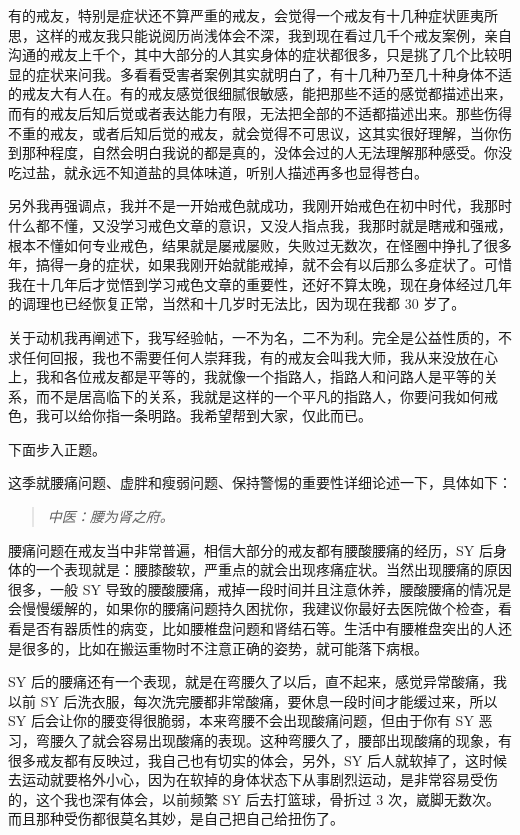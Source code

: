\documentclass{ctexart}
\begin{document}
有的戒友，特别是症状还不算严重的戒友，会觉得一个戒友有十几种症状匪夷所思，这样的戒友我只能说阅历尚浅体会不深，我到现在看过几千个戒友案例，亲自沟通的戒友上千个，其中大部分的人其实身体的症状都很多，只是挑了几个比较明显的症状来问我。多看看受害者案例其实就明白了，有十几种乃至几十种身体不适的戒友大有人在。有的戒友感觉很细腻很敏感，能把那些不适的感觉都描述出来，而有的戒友后知后觉或者表达能力有限，无法把全部的不适都描述出来。那些伤得不重的戒友，或者后知后觉的戒友，就会觉得不可思议，这其实很好理解，当你伤到那种程度，自然会明白我说的都是真的，没体会过的人无法理解那种感受。你没吃过盐，就永远不知道盐的具体味道，听别人描述再多也显得苍白。

另外我再强调点，我并不是一开始戒色就成功，我刚开始戒色在初中时代，我那时什么都不懂，又没学习戒色文章的意识，又没人指点我，我那时就是瞎戒和强戒，根本不懂如何专业戒色，结果就是屡戒屡败，失败过无数次，在怪圈中挣扎了很多年，搞得一身的症状，如果我刚开始就能戒掉，就不会有以后那么多症状了。可惜我在十几年后才觉悟到学习戒色文章的重要性，还好不算太晚，现在身体经过几年的调理也已经恢复正常，当然和十几岁时无法比，因为现在我都 30 岁了。

关于动机我再阐述下，我写经验帖，一不为名，二不为利。完全是公益性质的，不求任何回报，我也不需要任何人崇拜我，有的戒友会叫我大师，我从来没放在心上，我和各位戒友都是平等的，我就像一个指路人，指路人和问路人是平等的关系，而不是居高临下的关系，我就是这样的一个平凡的指路人，你要问我如何戒色，我可以给你指一条明路。我希望帮到大家，仅此而已。

下面步入正题。

这季就腰痛问题、虚胖和瘦弱问题、保持警惕的重要性详细论述一下，具体如下：

\begin{quote}\it
    中医：腰为肾之府。
\end{quote}

腰痛问题在戒友当中非常普遍，相信大部分的戒友都有腰酸腰痛的经历，SY 后身体的一个表现就是：腰膝酸软，严重点的就会出现疼痛症状。当然出现腰痛的原因很多，一般 SY 导致的腰酸腰痛，戒掉一段时间并且注意休养，腰酸腰痛的情况是会慢慢缓解的，如果你的腰痛问题持久困扰你，我建议你最好去医院做个检查，看看是否有器质性的病变，比如腰椎盘问题和肾结石等。生活中有腰椎盘突出的人还是很多的，比如在搬运重物时不注意正确的姿势，就可能落下病根。

SY 后的腰痛还有一个表现，就是在弯腰久了以后，直不起来，感觉异常酸痛，我以前 SY 后洗衣服，每次洗完腰都非常酸痛，要休息一段时间才能缓过来，所以 SY 后会让你的腰变得很脆弱，本来弯腰不会出现酸痛问题，但由于你有 SY 恶习，弯腰久了就会容易出现酸痛的表现。这种弯腰久了，腰部出现酸痛的现象，有很多戒友都有反映过，我自己也有切实的体会，另外，SY 后人就软掉了，这时候去运动就要格外小心，因为在软掉的身体状态下从事剧烈运动，是非常容易受伤的，这个我也深有体会，以前频繁 SY 后去打篮球，骨折过 3 次，崴脚无数次。而且那种受伤都很莫名其妙，是自己把自己给扭伤了。
\end{document}
